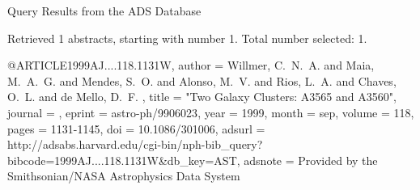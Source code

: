 Query Results from the ADS Database


Retrieved 1 abstracts, starting with number 1.  Total number selected: 1.

@ARTICLE{1999AJ....118.1131W,
   author = {{Willmer}, C.~N.~A. and {Maia}, M.~A.~G. and {Mendes}, S.~O. and 
	{Alonso}, M.~V. and {Rios}, L.~A. and {Chaves}, O.~L. and {de Mello}, D.~F.
	},
    title = "{Two Galaxy Clusters: A3565 and A3560}",
  journal = {\aj},
   eprint = {astro-ph/9906023},
     year = 1999,
    month = sep,
   volume = 118,
    pages = {1131-1145},
      doi = {10.1086/301006},
   adsurl = {http://adsabs.harvard.edu/cgi-bin/nph-bib_query?bibcode=1999AJ....118.1131W&db_key=AST},
  adsnote = {Provided by the Smithsonian/NASA Astrophysics Data System}
}


